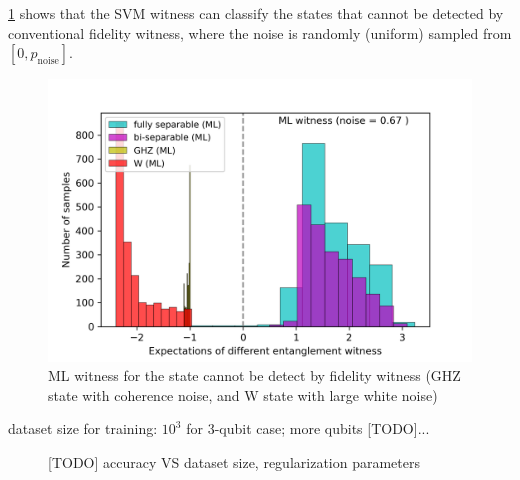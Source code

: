 \documentclass[
reprint,
aps,
pra,
floatfix,
]{revtex4-2}
\theoremstyle{plain}
\theoremstyle{definition}
\newcommand{\noise}{\text{noise}}
\begin{document}

\cref{fig:ml_compare} shows that the SVM witness can classify the states that cannot be detected by conventional fidelity witness,
where the noise is randomly (uniform) sampled from $[0,p_{\noise}]$.

\begin{figure}[!ht]
	\centering
		\includegraphics[width=.9\linewidth]{./Code/three_qubit_hist_ML.png}
	\caption{ML witness for the state cannot be detect by fidelity witness (GHZ state with coherence noise, and W state with large white noise)}
	\label{fig:ml_compare}
\end{figure}

dataset size for training: $10^3$ for 3-qubit case; more qubits [TODO]...
\begin{figure}[!ht]
	\centering
	\caption{[TODO] accuracy VS dataset size, regularization parameters}
\end{figure}
\end{document}
